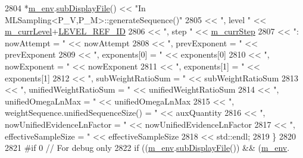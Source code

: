 \begin{DoxyCode}
2804           *\hyperlink{class_q_u_e_s_o_1_1_m_l_sampling_a13f1ca4fe9f94822fe572a743eaced1d}{m\_env}.\hyperlink{class_q_u_e_s_o_1_1_base_environment_a8a0064746ae8dddfece4229b9ad374d6}{subDisplayFile}() << \textcolor{stringliteral}{"In MLSampling<P\_V,P\_M>::generateSequence()"}
2805                                   << \textcolor{stringliteral}{", level "}                                  << 
      \hyperlink{class_q_u_e_s_o_1_1_m_l_sampling_af9416874c856e50f3b35270e801f17e4}{m\_currLevel}+\hyperlink{_m_l_sampling_level_options_8h_a68d15eaf394d210effcf584b938206d3}{LEVEL\_REF\_ID}
2806                                   << \textcolor{stringliteral}{", step "}                                   << 
      \hyperlink{class_q_u_e_s_o_1_1_m_l_sampling_a1b1f8ccb4823bdfa26ec652f0807c63e}{m\_currStep}
2807                                   << \textcolor{stringliteral}{": nowAttempt = "}                           << nowAttempt
2808                                   << \textcolor{stringliteral}{", prevExponent = "}                         << prevExponent
2809                                   << \textcolor{stringliteral}{", exponents[0] = "}                         << exponents[0]
2810                                   << \textcolor{stringliteral}{", nowExponent = "}                          << nowExponent
2811                                   << \textcolor{stringliteral}{", exponents[1] = "}                         << exponents[1]
2812                                   << \textcolor{stringliteral}{", subWeightRatioSum = "}                    << subWeightRatioSum
2813                                   << \textcolor{stringliteral}{", unifiedWeightRatioSum = "}                << unifiedWeightRatioSum
2814                                   << \textcolor{stringliteral}{", unifiedOmegaLnMax = "}                    << unifiedOmegaLnMax
2815                                   << \textcolor{stringliteral}{", weightSequence.unifiedSequenceSize() = "} << auxQuantity
2816                                   << \textcolor{stringliteral}{", nowUnifiedEvidenceLnFactor = "}           << 
      nowUnifiedEvidenceLnFactor
2817                                   << \textcolor{stringliteral}{", effectiveSampleSize = "}                  << effectiveSampleSize
2818                                   << std::endl;
2819         \}
2820 
2821 \textcolor{preprocessor}{#if 0 // For debug only}
2822 \textcolor{preprocessor}{}        \textcolor{keywordflow}{if} ((\hyperlink{class_q_u_e_s_o_1_1_m_l_sampling_a13f1ca4fe9f94822fe572a743eaced1d}{m\_env}.\hyperlink{class_q_u_e_s_o_1_1_base_environment_a8a0064746ae8dddfece4229b9ad374d6}{subDisplayFile}()) && (\hyperlink{class_q_u_e_s_o_1_1_m_l_sampling_a13f1ca4fe9f94822fe572a743eaced1d}{m\_env}.

\end{DoxyCode}
